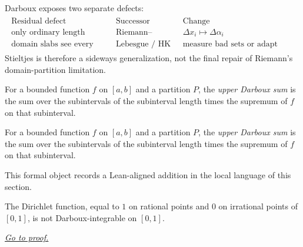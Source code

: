 \begin{remark*}[Interpretation]
Darboux exposes two separate defects:
\[
\begin{aligned}
\begin{array}{c|c|c}
\text{Residual defect} & \text{Successor} & \text{Change}\\
\hline
\text{only ordinary length} & \text{Riemann--Stieltjes} &
\Delta x_i\mapsto \Delta\alpha_i\\
\text{domain slabs see every bad set} & \text{Lebesgue / HK} &
\text{measure bad sets or adapt fineness}
\end{array}
\end{aligned}
\]
Stieltjes is therefore a sideways generalization, not the final repair of
Riemann's domain-partition limitation.
\end{remark*}

\begin{definition}
\label{def:upper-darboux-sum}
For a bounded function $f$ on $[a,b]$ and a partition $P$, the \emph{upper Darboux sum} is the sum over the subintervals of the subinterval length times the supremum of $f$ on that subinterval.
\end{definition}

\begin{remark*}
For a bounded function $f$ on $[a,b]$ and a partition $P$, the \emph{upper Darboux sum} is the sum over the subintervals of the subinterval length times the supremum of $f$ on that subinterval.
\end{remark*}

\begin{remark*}[Interpretation]
This formal object records a Lean-aligned addition in the local language of this section.
\end{remark*}

\begin{dependencies}
\NoLocalDependencies
\end{dependencies}
\begin{theorem}
\label{thm:dirichlet-not-darboux-integrable}
The Dirichlet function, equal to $1$ on rational points and $0$ on irrational points of $[0,1]$, is not Darboux-integrable on $[0,1]$.

\smallskip
\noindent
\hyperref[prf:dirichlet-not-darboux-integrable]{\textit{Go to proof.}}
\end{theorem}

